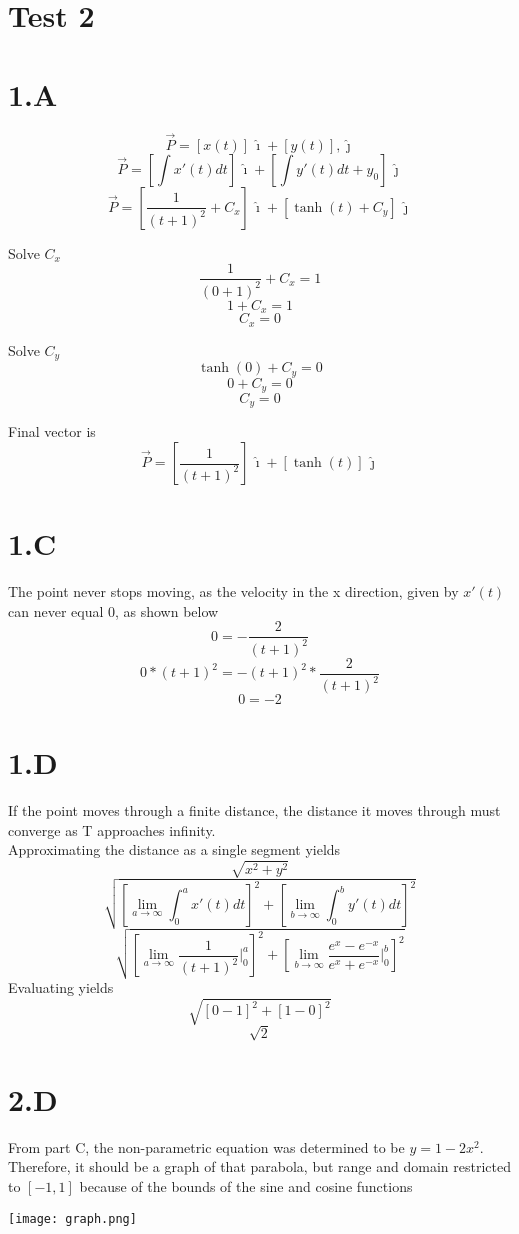 \documentclass{article}
\newcommand{\ihat}{\mathbf {\hat \imath}}
\newcommand{\jhat}{\mathbf {\hat \jmath}}
\begin{document}
\section*{Test 2}
\section*{1.A}
$$ \vec{P} = [x(t)]\, \ihat + [y(t)], \jhat $$
$$ \vec{P} = [\int x'(t)dt] \, \ihat + [\int y'(t)dt +y_0] \, \jhat $$
$$ \vec{P} = [\frac{1}{(t+1)^2} +C_x] \, \ihat + [\tanh(t)+C_y] \, \jhat $$

Solve $C_x$
$$\frac{1}{(0+1)^2} +C_x = 1$$
$$1 +C_x = 1$$
$$C_x = 0$$

Solve $C_y$
$$\tanh(0) +C_y = 0$$
$$0 +C_y = 0$$
$$C_y = 0$$

Final vector is 
$$ \vec{P} = [\frac{1}{(t+1)^2}] \, \ihat + [\tanh(t)] \, \jhat $$

\section*{1.C}
The point never stops moving, as the velocity in the x direction, given by $x'(t)$ can never equal 0, as shown below
$$0=- \frac{2}{(t+1)^2} $$
$$0*(t+1)^2 = - (t+1)^2* \frac{2}{(t+1)^2} $$
$$0 = -2 $$

\section*{1.D}
If the point moves through a finite distance, the distance it moves through must converge as T approaches infinity.
\\
Approximating the distance as a single segment yields
$$ \sqrt{x^2+y^2} $$
$$ \sqrt{[ \lim_{a\to\infty} \int_0^{a} x'(t)dt]^2+[ \lim_{b\to\infty} \int_0^{b} y'(t)dt]^2} $$
$$ \sqrt{[ \lim_{a\to\infty} \frac{1}{(t+1)^2}|_0^a]^2+[ \lim_{b\to\infty} \frac{e^x-e^{-x}}{e^x+e^{-x}}|_0^{b}]^2} $$
Evaluating yields
$$ \sqrt{[ 0 - 1]^2+[ 1-0]^2} $$
$$ \sqrt{2} $$

\section*{2.D}

From part C, the non-parametric equation was determined to be $y=1-2x^2$. Therefore, it should be a graph of that parabola, but range and domain restricted to $[-1,1]$ because of the bounds of the sine and cosine functions
\begin{center}
\texttt{[image: graph.png]}
\end{center}
\end{document}
